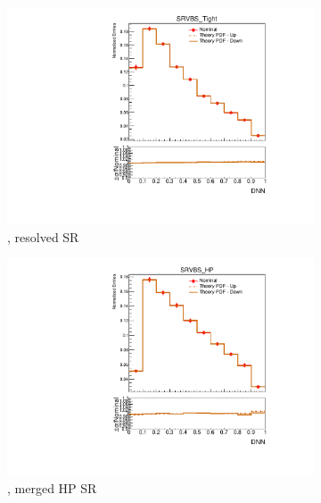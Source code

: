 \begin{figure}[ht]
    \centering
    \begin{subfigure}[b]{0.3\textwidth}
        \includegraphics[width=\textwidth]{figures/1lep/PDFUnc/TheoryPDF/W_0ptag2pjet_0ptv_SRVBS_Tight_DNN_SysTheoryPDF_W__1up_Norm.pdf}
        \caption{\Wjets, resolved SR}
    \end{subfigure}
    \begin{subfigure}[b]{0.3\textwidth}
        \includegraphics[width=\textwidth]{figures/1lep/PDFUnc/TheoryPDF/W_0ptag1pfat0pjet_0ptv_SRVBS_HP_DNN_SysTheoryPDF_W__1up_Norm.pdf}
        \caption{\Wjets, merged HP SR}
    \end{subfigure}
    \begin{subfigure}[b]{0.3\textwidth}

\end{subfigure}
\end{figure}
